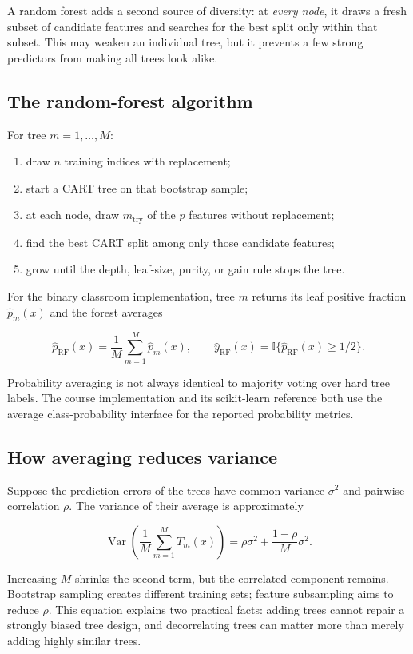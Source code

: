 \documentclass[11pt]{article}
\newcommand{\ind}{\mathbb{1}}
\renewcommand{\ind}{\mathbb{I}}
\begin{document}
A random forest adds a second source of diversity: at \emph{every node}, it
draws a fresh subset of candidate features and searches for the best split only
within that subset. This may weaken an individual tree, but it prevents a few
strong predictors from making all trees look alike.

\subsection{The random-forest algorithm}

For tree $m=1,\ldots,M$:

\begin{enumerate}
\item draw $n$ training indices with replacement;
\item start a CART tree on that bootstrap sample;
\item at each node, draw $m_{\mathrm{try}}$ of the $p$ features without
replacement;
\item find the best CART split among only those candidate features;
\item grow until the depth, leaf-size, purity, or gain rule stops the tree.
\end{enumerate}

For the binary classroom implementation, tree $m$ returns its leaf positive
fraction $\hat p_m(x)$ and the forest averages

\[
 \hat p_{\mathrm{RF}}(x)=\frac1M\sum_{m=1}^{M}\hat p_m(x),
 \qquad
 \hat y_{\mathrm{RF}}(x)=\ind\{\hat p_{\mathrm{RF}}(x)\geq 1/2\}.
\]

Probability averaging is not always identical to majority voting over hard tree
labels. The course implementation and its scikit-learn reference both use the
average class-probability interface for the reported probability metrics.

\subsection{How averaging reduces variance}

Suppose the prediction errors of the trees have common variance $\sigma^2$ and
pairwise correlation $\rho$. The variance of their average is approximately

\[
 \operatorname{Var}\!\left(\frac1M\sum_{m=1}^{M}T_m(x)\right)
 =\rho\sigma^2+\frac{1-\rho}{M}\sigma^2.
\]

Increasing $M$ shrinks the second term, but the correlated component remains.
Bootstrap sampling creates different training sets; feature subsampling aims to
reduce $\rho$. This equation explains two practical facts: adding trees cannot
repair a strongly biased tree design, and decorrelating trees can matter more
than merely adding highly similar trees.
\end{document}
